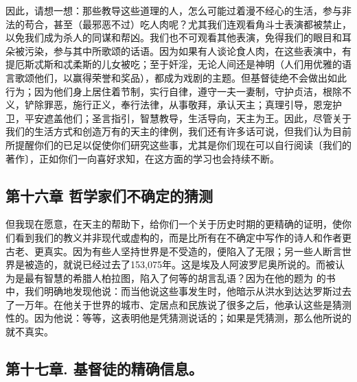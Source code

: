 因此，请想一想：那些教导这些道理的人，怎么可能过着漫不经心的生活，参与非法的苟合，甚至（最邪恶不过）吃人肉呢？尤其我们连观看角斗士表演都被禁止，以免我们成为杀人的同谋和帮凶。我们也不可观看其他表演，免得我们的眼目和耳朵被污染，参与其中所歌颂的话语。因为如果有人谈论食人肉，在这些表演中，有提厄斯忒斯和忒柔斯的儿女被吃；至于奸淫，无论人间还是神明（人们用优雅的语言歌颂他们，以赢得荣誉和奖品），都成为戏剧的主题。但基督徒绝不会做出如此行为；因为他们身上居住着节制，实行自律，遵守一夫一妻制，守护贞洁，根除不义，铲除罪恶，施行正义，奉行法律，从事敬拜，承认天主；真理引导，恩宠护卫，平安遮盖他们；圣言指引，智慧教导，生活导向，天主为王。因此，尽管关于我们的生活方式和创造万有的天主的律例，我们还有许多话可说，但我们认为目前所提醒你们的已足以促使你们研究这些事，尤其是你们现在可以自行阅读〔我们的著作〕，正如你们一向喜好求知，在这方面的学习也会持续不断。\par


\subsection{第十六章 哲学家们不确定的猜测}

但我现在愿意，在天主的帮助下，给你们一个关于历史时期的更精确的证明，使你们看到我们的教义并非现代或虚构的，而是比所有在不确定中写作的诗人和作者更古老、更真实。因为有些人坚持世界是不受造的，便陷入了无限；另一些人断言世界是被造的，就说已经过去了153,075年。这是埃及人阿波罗尼奥所说的。而被认为是最有智慧的希腊人柏拉图，陷入了何等的胡言乱语？因为在他的题为  的书中，我们明确地发现他说：而当他说这些事发生时，他暗示从洪水到达达罗斯过去了一万年。在他关于世界的城市、定居点和民族说了很多之后，他承认这些是猜测性的。因为他说：等等，这表明他是凭猜测说话的；如果是凭猜测，那么他所说的就不真实。\par


\subsection{第十七章. 基督徒的精确信息。}

